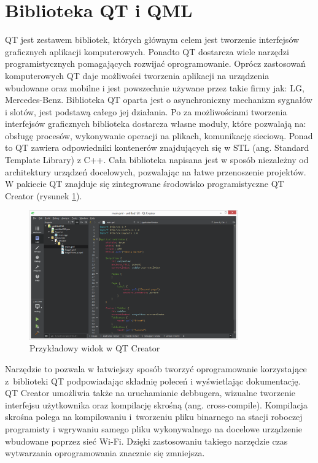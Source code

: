 \documentclass[12pt, eng, twoside, openany, final]{mgr}
\begin{document}
    \section{Biblioteka QT i QML}
    QT jest zestawem bibliotek, których głównym celem jest tworzenie interfejsów graficznych aplikacji komputerowych. Ponadto QT dostarcza wiele narzędzi programistycznych pomagających rozwijać oprogramowanie. Oprócz zastosowań komputerowych QT daje możliwości tworzenia aplikacji na urządzenia wbudowane oraz mobilne i jest powszechnie używane przez takie firmy jak: LG, Mercedes-Benz. Biblioteka QT oparta jest o asynchroniczny mechanizm sygnałów i slotów, jest podstawą całego  jej działania. Po za możliwościami tworzenia interfejsów graficznych biblioteka dostarcza własne moduły, które pozwalają na: obsługę procesów, wykonywanie operacji na plikach, komunikację sieciową. Ponad to QT zawiera odpowiedniki kontenerów znajdujących się w STL\cite{EffectiveModern} (ang. Standard Template Library) z C++. Cała biblioteka napisana jest w sposób niezależny od architektury urządzeń docelowych, pozwalając na łatwe przenoszenie projektów. W pakiecie QT znajduje się zintegrowane środowisko programistyczne QT Creator (rysunek \ref{fig:qtc}). 
        \begin{figure}[H]
        \begin{center}
            \includegraphics[width=0.8\textwidth]{qtc.png}
            \caption{Przykładowy widok w QT Creator }
            \label{fig:qtc}
        \end{center}
        \end{figure}
    \noindent Narzędzie to pozwala w łatwiejszy sposób tworzyć oprogramowanie korzystające z~biblioteki QT podpowiadając składnię poleceń i wyświetlając dokumentację. QT Creator umożliwia także na uruchamianie debbugera\cite{debugger}, wizualne tworzenie interfejsu użytkownika oraz kompilację skrośną\cite{RpiBeginner} (ang. cross-compile). Kompilacja skrośna polega na kompilowaniu i~tworzeniu pliku binarnego na stacji roboczej programisty i wgrywaniu samego pliku wykonywalnego na docelowe urządzenie wbudowane poprzez sieć Wi-Fi. Dzięki zastosowaniu takiego narzędzie czas wytwarzania oprogramowania znacznie się zmniejsza. 
     
\end{document}
